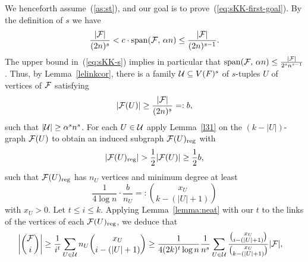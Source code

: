 \documentclass[11pt]{article}
\makeatletter
\renewenvironment{proof}[1][\proofname]
{\par\pushQED{\qed}
	\normalfont\topsep6\p@\@plus6\p@\relax\trivlist
	\item[\hskip\labelsep\bfseries#1\@addpunct{.}]
	\ignorespaces}
{\popQED\endtrivlist\@endpefalse}
\newcommand{\FF}{{\cal F}}
\newcommand{\UU}{{\cal U}}
\renewcommand{\wp}{\mathrm{span}}
\renewcommand{\a}{\alpha}
\renewcommand{\d}{\delta}
\newcommand{\sub}{\subseteq}
\makeatother
\begin{document}
\begin{proof}[Proof of Theorem~\ref{th:skk}]
	We henceforth assume~(\ref{as:st}), and our goal is to prove~(\ref{eq:sKK-first-goal}).
	By the definition of $s$ we have 
	\begin{equation}\label{eq:sKK-s}
	\frac{|\FF|}{(2n)^s} < c \cdot \wp(\FF,\, \a n) \le \frac{|\FF|}{(2n)^{s-1}}.
	\end{equation}
	The upper bound in~(\ref{eq:sKK-s}) implies in particular that $\wp(\FF,\, \a n) \le \frac{|\FF|}{2^{s} n^{s-1}}$.
	Thus, by Lemma~\ref{lelinkcor}, there is a family $\UU \sub V(F)^s$ of $s$-tuples 
	$U$ of vertices of $\FF$ satisfying 
	\begin{equation}\label{eq:link}
	|\FF(U)| \ge \frac{|\FF|}{(2n)^s} =: b ,
	\end{equation}
	such that $|\UU| \ge \a^s n^s$.
	For each $U \in \UU$ apply Lemma~\ref{l31} on the $(k-|U|)$-graph $\FF(U)$ to obtain an induced subgraph $\FF(U)\reg$ 
	with
	\begin{equation}\label{eq:link-edges}
	|\FF(U)\reg| > \frac12|\FF(U)| \ge \frac12 b,
	\end{equation}
	such that $\FF(U)\reg$ has $n_U$ vertices and minimum degree at least
	\begin{equation}\label{eq:F_U}
	\frac{1}{4 \log n} \cdot \frac{b}{n_U} =: \binom{x_U}{k-(|U|+1)}
	\end{equation}
	with $x_U>0$.
	Let $t \le i \le k$.
	Applying Lemma~\ref{lemma:neat} with our $t$ to the links of the vertices of each $\FF(U)\reg$, we deduce that
	\begin{align}\label{eq:sKK-main}
	\bigg|\binom{\FF}{i}\bigg| &\ge \frac{1}{i^t}\sum_{U \in \UU} n_U\binom{x_U}{i-(|U|+1)} 
	\ge \frac{1}{4(2k)^t\log n} \frac{1}{n^s}\sum_{U \in \UU}\frac{\binom{x_U}{i-(|U|+1)}}{\binom{x_U}{k-(|U|+1)}} |\FF| ,%

\end{align}
\end{proof}
\end{document}
